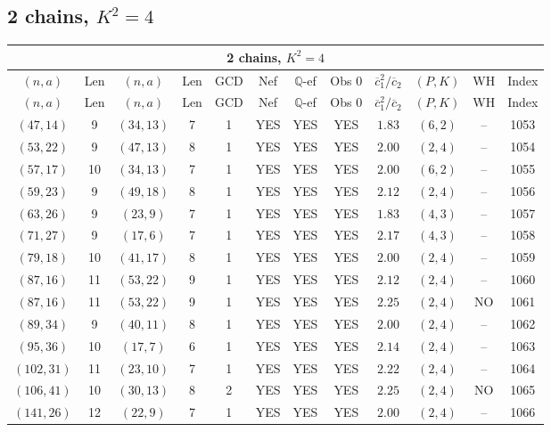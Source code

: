 \subsection{2 chains, $K^2 = 4$}
\begin{longtable}{|c|c|c|c|c|c|c|c|c|c|c|c|}
\hline
\multicolumn{12}{|c|}{2 chains, $K^2 = 4$}\\
\hline
$(n,a)$ & Len & $(n,a)$ & Len & GCD & Nef & $\mathbb Q$-ef & Obs 0 & $\overline c_1^2 / \overline c_2$ & $(P,K)$ & WH & Index\\
\hline
\endfirsthead

\hline
$(n,a)$ & Len & $(n,a)$ & Len & GCD & Nef & $\mathbb Q$-ef & Obs 0 & $\overline c_1^2 / \overline c_2$ & $(P,K)$ & WH & Index\\
\hline
\endhead
\hline
\endfoot

$(47,14)$ & 9 & $(34,13)$ & 7 & 1 & YES & YES & YES & $1.83$ & $(6,2)$ & -- & 1053\\
$(53,22)$ & 9 & $(47,13)$ & 8 & 1 & YES & YES & YES & $2.00$ & $(2,4)$ & -- & 1054\\
$(57,17)$ & 10 & $(34,13)$ & 7 & 1 & YES & YES & YES & $2.00$ & $(6,2)$ & -- & 1055\\
$(59,23)$ & 9 & $(49,18)$ & 8 & 1 & YES & YES & YES & $2.12$ & $(2,4)$ & -- & 1056\\
$(63,26)$ & 9 & $(23,9)$ & 7 & 1 & YES & YES & YES & $1.83$ & $(4,3)$ & -- & 1057\\
$(71,27)$ & 9 & $(17,6)$ & 7 & 1 & YES & YES & YES & $2.17$ & $(4,3)$ & -- & 1058\\
$(79,18)$ & 10 & $(41,17)$ & 8 & 1 & YES & YES & YES & $2.00$ & $(2,4)$ & -- & 1059\\
$(87,16)$ & 11 & $(53,22)$ & 9 & 1 & YES & YES & YES & $2.12$ & $(2,4)$ & -- & 1060\\
$(87,16)$ & 11 & $(53,22)$ & 9 & 1 & YES & YES & YES & $2.25$ & $(2,4)$ & NO & 1061\\
$(89,34)$ & 9 & $(40,11)$ & 8 & 1 & YES & YES & YES & $2.00$ & $(2,4)$ & -- & 1062\\
$(95,36)$ & 10 & $(17,7)$ & 6 & 1 & YES & YES & YES & $2.14$ & $(2,4)$ & -- & 1063\\
$(102,31)$ & 11 & $(23,10)$ & 7 & 1 & YES & YES & YES & $2.22$ & $(2,4)$ & -- & 1064\\
$(106,41)$ & 10 & $(30,13)$ & 8 & 2 & YES & YES & YES & $2.25$ & $(2,4)$ & NO & 1065\\
$(141,26)$ & 12 & $(22,9)$ & 7 & 1 & YES & YES & YES & $2.00$ & $(2,4)$ & -- & 1066\\

\end{longtable}
